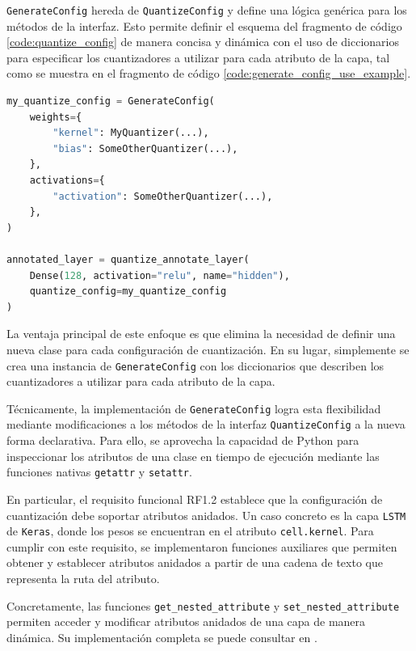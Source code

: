 \texttt{GenerateConfig} hereda de \texttt{QuantizeConfig} y define una lógica genérica para los métodos de la interfaz. Esto permite definir el esquema del fragmento de código \ref{code:quantize_config} de manera concisa y dinámica con el uso de diccionarios para especificar los cuantizadores a utilizar para cada atributo de la capa, tal como se muestra en el fragmento de código \ref{code:generate_config_use_example}.

\newpage
\begin{lstlisting}[language=Python,label=code:generate_config_use_example,caption=Ejemplo de uso de la clase \texttt{GenerateConfig} de \texttt{QTensor}.]
my_quantize_config = GenerateConfig(
    weights={
        "kernel": MyQuantizer(...),
        "bias": SomeOtherQuantizer(...),
    },
    activations={
        "activation": SomeOtherQuantizer(...),
    },
)

annotated_layer = quantize_annotate_layer(
    Dense(128, activation="relu", name="hidden"),
    quantize_config=my_quantize_config
)
\end{lstlisting}

La ventaja principal de este enfoque es que elimina la necesidad de definir una nueva clase para cada configuración de cuantización. En su lugar, simplemente se crea una instancia de \texttt{GenerateConfig} con los diccionarios que describen los cuantizadores a utilizar para cada atributo de la capa.

Técnicamente, la implementación de \texttt{GenerateConfig} logra esta flexibilidad mediante modificaciones a los métodos de la interfaz \texttt{QuantizeConfig} a la nueva forma declarativa. Para ello, se aprovecha la capacidad de Python para inspeccionar los atributos de una clase en tiempo de ejecución mediante las funciones nativas \texttt{getattr} y \texttt{setattr}.

En particular, el requisito funcional RF1.2 establece que la configuración de cuantización debe soportar atributos anidados. Un caso concreto es la capa \texttt{LSTM} de \texttt{Keras}, donde los pesos se encuentran en el atributo \texttt{cell.kernel}. Para cumplir con este requisito, se implementaron funciones auxiliares que permiten obtener y establecer atributos anidados a partir de una cadena de texto que representa la ruta del atributo.

Concretamente, las funciones \texttt{get\_nested\_attribute} y \texttt{set\_nested\_attribute} permiten acceder y modificar atributos anidados de una capa de manera dinámica. Su implementación completa se puede consultar en \cite{qtensor_generate_config}.

